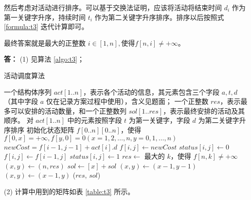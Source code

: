 \documentclass[12pt,a4paper]{ctexart}
\begin{document}
然后考虑对活动进行排序。可以基于交换法证明，应该将活动将结束时间 $d_i$ 作为第一关键字升序，持续时间 $t_i$ 作为第二关键字升序排序。排序以后按照式 \eqref{formula:t3} 迭代计算即可。

最终答案就是最大的正整数 $i \in [1, n], \text{使得} f[n, i] \neq +\infty$。

\vspace{5pt}
\noindent
{\bf 答：} (1) 见算法 \ref{algo:t3}；

\begin{algorithm}
  \caption{活动调度算法} \label{algo:t3}
  \begin{algorithmic}[1]
    \Require 一个结构体序列 $act[1..n]$，表示各个活动的信息，其元素包含三个字段 $a, t, d$（其中字段 $a$ 仅在记录方案过程中使用），含义见题面；
    \Ensure 一个正整数 $res$，表示最多可以安排的活动数量，和一个正整数列 $sol[1..res]$，表示最终安排的活动及其顺序。
      \State 对 $act[1..n]$ 中的元素按照字段 $t$ 为第一关键字，字段 $d$ 为第二关键字升序排序
      \State 初始化状态矩阵 $f[0..n][0..n]$，使得 $f[0, x] = +\infty, f[y, 0] = 0 (x = 1,2,\ldots,n, y=0,1,\ldots,n)$
          \State $newCost = f[i-1, j-1] + act[i].d$
            \State $f[i, j] \gets newCost$
            \State $status[i, j] \gets 0$ 
          \Else
            \State $f[i, j] \gets f[i-1, j]$
            \State $status[i, j] \gets 1$
          \EndIf
        \EndFor
      \EndFor
      \State $res \gets$ 最大的 $k$，使得 $f[n,k] \neq +\infty$
      \State $(x, y) \gets (n, res)$
          \State $sol \gets [x] + sol$ 
          \State $(x, y) \gets (x-1, y-1)$
        \Else
          \State $(x, y) \gets (x-1, y)$
        \EndIf
      \EndWhile
      \State \Return ($res$, $sol$)
    \EndFunction
  \end{algorithmic}
\end{algorithm}

(2) 计算中用到的矩阵如表 \ref{table:t3} 所示。
\end{document}
